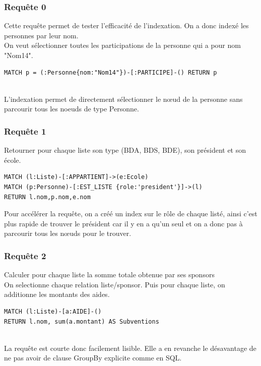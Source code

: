 \documentclass[a4paper,oneside,1pt]{article}
\begin{document}
\subsubsection{Requête 0}
Cette requête permet de tester l'efficacité de l'indexation. On a donc indexé les personnes par leur nom.
\\
On veut sélectionner toutes les participations de la personne qui a pour nom "Nom14". 
\\
\begin{verbatim}
MATCH p = (:Personne{nom:"Nom14"})-[:PARTICIPE]-() RETURN p
\end{verbatim}
\\L'indexation permet de directement sélectionner le nœud de la personne sans parcourir tous les noeuds de type Personne.

\subsubsection{Requête 1}
Retourner pour chaque liste son type (BDA, BDS, BDE), son président et son école.
\\
\begin{verbatim}
MATCH (l:Liste)-[:APPARTIENT]->(e:Ecole)
MATCH (p:Personne)-[:EST_LISTE {role:'president'}]->(l)
RETURN l.nom,p.nom,e.nom
\end{verbatim}

Pour accélérer la requête, on a créé un index sur le rôle de chaque listé, ainsi c'est plus rapide de trouver le président car il y en a qu'un seul et on a donc pas à parcourir tous les nœuds pour le trouver.


\subsubsection{Requête 2}
Calculer pour chaque liste la somme totale obtenue par ses sponsors
\\
On selectionne chaque relation liste/sponsor. Puis pour chaque liste, on additionne les montants des aides.
\\
\begin{verbatim}
MATCH (l:Liste)-[a:AIDE]-() 
RETURN l.nom, sum(a.montant) AS Subventions
\end{verbatim}
\\
La requête est courte donc facilement lisible. Elle a en revanche le désavantage de ne pas avoir de clause GroupBy explicite comme en SQL.
\end{document}
